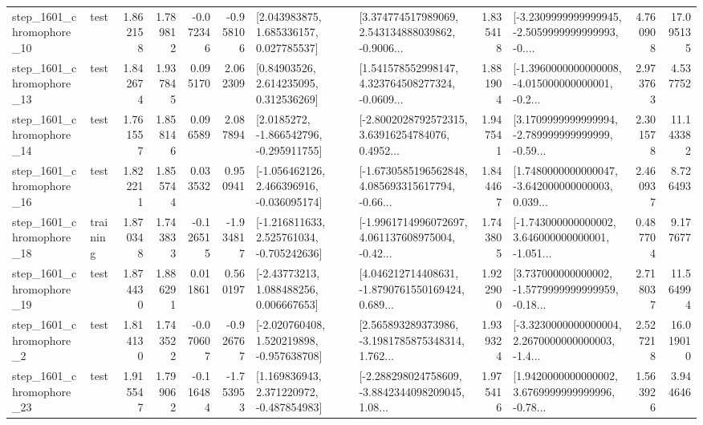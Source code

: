 \begin{tabular}{llrrrrllrlrr}
 step\_1601\_chromophore\_10 &      test &      1.862158 &    1.789812 &     -0.072346 & -0.958106 &     [2.043983875, 1.685336157, 0.027785537] &  [3.374774517989069, 2.543134888039862, -0.9006... &       1.835418 &  [-3.2309999999999945, -2.5059999999999993, -0.... &            4.760908 &         17.095135 \\
 step\_1601\_chromophore\_13 &      test &      1.842674 &    1.937845 &      0.095170 &  2.062309 &      [0.84903526, 2.614235095, 0.312536269] &  [1.541578552998147, 4.323764508277324, -0.0609... &       1.881904 &  [-1.3960000000000008, -4.015000000000001, -0.2... &            2.973763 &          4.537752 \\
 step\_1601\_chromophore\_14 &      test &      1.761557 &    1.858146 &      0.096589 &  2.087894 &     [2.0185272, -1.866542796, -0.295911755] &  [-2.8002028792572315, 3.63916254784076, 0.4952... &       1.947541 &  [3.1709999999999994, -2.789999999999999, -0.59... &            2.301578 &         11.143382 \\
 step\_1601\_chromophore\_16 &      test &      1.822211 &    1.855744 &      0.033532 &  0.950941 &   [-1.056462126, 2.466396916, -0.036095174] &  [-1.6730585196562848, 4.085693315617794, -0.66... &       1.844467 &  [1.7480000000000047, -3.642000000000003, 0.039... &            2.460937 &          8.726493 \\
 step\_1601\_chromophore\_18 &  training &      1.870348 &    1.743833 &     -0.126515 & -1.934817 &   [-1.216811633, 2.525761034, -0.705242636] &  [-1.9961714996072697, 4.061137608975004, -0.42... &       1.743805 &  [-1.743000000000002, 3.646000000000001, -1.051... &            0.487704 &          9.177677 \\
 step\_1601\_chromophore\_19 &      test &      1.874430 &    1.886291 &      0.011861 &  0.560197 &     [-2.43773213, 1.088488256, 0.006667653] &  [4.046212714408631, -1.8790761550169424, 0.689... &       1.922900 &  [3.737000000000002, -1.5779999999999959, -0.18... &            2.718037 &         11.564994 \\
  step\_1601\_chromophore\_2 &      test &      1.814130 &    1.743522 &     -0.070607 & -0.926767 &   [-2.020760408, 1.520219898, -0.957638708] &  [2.565893289373986, -3.1981785875348314, 1.762... &       1.939324 &  [-3.3230000000000004, 2.2670000000000003, -1.4... &            2.527218 &         16.019010 \\
 step\_1601\_chromophore\_23 &      test &      1.915547 &    1.799062 &     -0.116484 & -1.753953 &    [1.169836943, 2.371220972, -0.487854983] &  [-2.288298024758609, -3.8842344098209045, 1.08... &       1.975416 &  [1.9420000000000002, 3.6769999999999996, -0.78... &            1.563926 &          3.944646 \\

\end{tabular}
